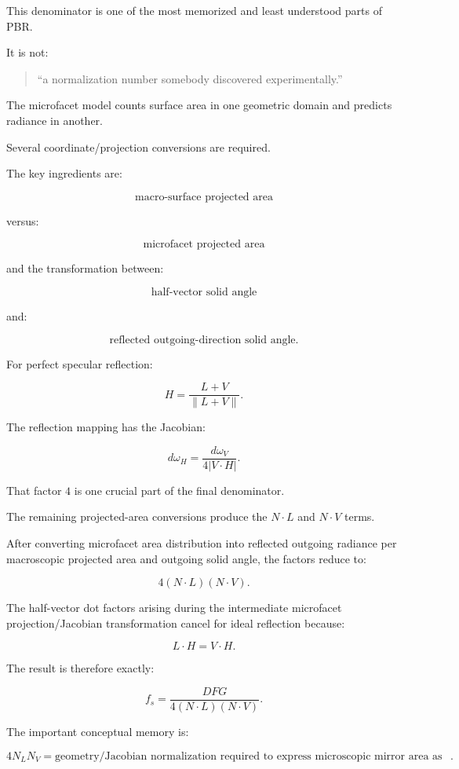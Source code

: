 This denominator is one of the most memorized and least understood parts of PBR.

It is not:

\begin{quote}
``a normalization number somebody discovered experimentally.''
\end{quote}

The microfacet model counts surface area in one geometric domain and predicts radiance in another.

Several coordinate/projection conversions are required.

The key ingredients are:

\[
\boxed{
\text{macro-surface projected area}
}
\]

versus:

\[
\boxed{
\text{microfacet projected area}
}
\]

and the transformation between:

\[
\boxed{
\text{half-vector solid angle}
}
\]

and:

\[
\boxed{
\text{reflected outgoing-direction solid angle}.
}
\]

For perfect specular reflection:

\[
H=
\frac{L+V}{\|L+V\|}.
\]

The reflection mapping has the Jacobian:

\[
\boxed{
d\omega_H
=
\frac{
d\omega_V
}{
4|V\cdot H|
}.
}
\]

That factor \(4\) is one crucial part of the final denominator.

The remaining projected-area conversions produce the \(N\cdot L\) and \(N\cdot V\) terms.

After converting microfacet area distribution into reflected outgoing radiance per macroscopic projected area and outgoing solid angle, the factors reduce to:

\[
\boxed{
4(N\cdot L)(N\cdot V)
}.
\]

The half-vector dot factors arising during the intermediate microfacet projection/Jacobian transformation cancel for ideal reflection because:

\[
L\cdot H=V\cdot H.
\]

The result is therefore exactly:

\[
f_s=
\frac{DFG}
{4(N\cdot L)(N\cdot V)}.
\]

The important conceptual memory is:

\[
\boxed{
4N_LN_V
=
\text{geometry/Jacobian normalization required to express microscopic mirror area as a macroscopic BRDF}.
}
\]

